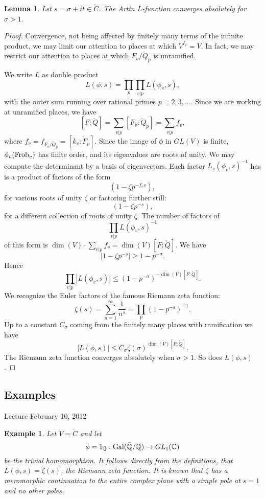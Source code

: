 \documentclass{amsart}
\newtheorem{lemma}[equation]{Lemma}
\newtheorem{example}[exercise]{Example}
\def\abs#1{{|#1|}}
\begin{document}
\begin{lemma} Let $s = \sigma+i t\in\ring{C}$.  The Artin $L$-function converges
absolutely for $\sigma >1$.
\end{lemma}

\begin{proof}  Convergence, not being affected by finitely many terms of the
infinite product, we
may limit our attention to places at which $V^{I_v}=V$.  In fact, we may restrict
our attention to places at which $F_v/\ring{Q}_p$ is unramified.

We write $L$ as double product
\[
L(\phi,s) = \prod_p \prod_{v|p} L(\phi_v,s),
\]
with the outer sum running over rational primes $p=2,3,\ldots$.
Since we are working at unramified places, we have
\[
[F:\ring{Q}] = \sum_{v|p} [F_v:\ring{Q}_p] = \sum_{v|p} f_v,
\]
where $f_v = f_{F_v/\ring{Q}_p}=[k_v:\ring{F}_p]$.
Since the image of $\phi$ in $GL(V)$ is finite, $\phi_v({\operatorname{Frob}}_v)$ has
finite order, and its eigenvalues are roots of unity.  We may compute the
determinant by a basis of eigenvectors.  Each factor $L_v(\phi_v,s)^{-1}$ has
is a product of factors of the form
\[
(1 - \zeta p^{-f_v s}),
\]
for various roots of unity $\zeta$
or factoring further still:
\[
(1 - \zeta p^{-s}),
\]
for a different collection of roots of unity $\zeta$.
The number of factors of 
\[
\prod_{v|p} L(\phi_v,s)^{-1}
\]
of this form is $\dim(V)\cdot\sum_{v|p} f_v = \dim(V)[F:\ring{Q}]$.
We have
\[
\abs{1 - \zeta p^{-s}} \ge 1 - p^{-\sigma}.
\]
Hence
\[
\prod_{v|p} \abs{L(\phi_v,s)} \le (1 - p^{-\sigma})^{-\dim(V)[F:\ring{Q}]}.
\]
We recognize the Euler factors of the famous Riemann zeta function:
\[
\zeta(s) = \sum_{n=1}^\infty \frac{1}{n^s} = \prod_p (1-p^{-s})^{-1}.
\]
Up to a constant $C_\sigma$ coming from the finitely many
places with ramification we have
\[
\abs{L(\phi,s)} \le C_\sigma \zeta(\sigma)^{\dim(V)[F:\ring{Q}]}.
\]
The Riemann zeta function converges absolutely when $\sigma>1$.  
So does $L(\phi,s)$.
\end{proof}

\subsection{Examples}

Lecture February 10, 2012

\begin{example} Let $V=\ring{C}$ and let 
\[
\phi={1}_{\mathbb{Q}}:{\operatorname{Gal}}(\bar{\mathbb{Q}}/\mathbb{Q})\to GL_1(\mathbb{C})
\]
be the trivial homomorphism.  It follows directly from the definitions,
that $L(\phi,s) = \zeta(s)$, the Riemann zeta function.  It is known
that $\zeta$ has a meromorphic continuation to the entire complex plane
with a simple pole at $s=1$ and no other poles.
\end{example}
\end{document}
